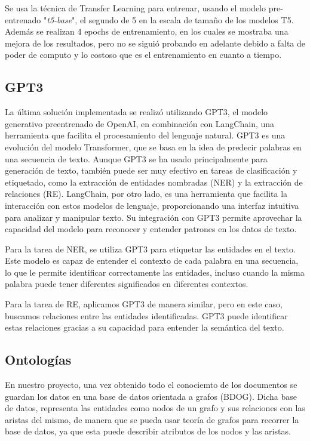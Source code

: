\documentclass[10pt]{article} %
\begin{document}
	Se usa la técnica de Transfer Learning para entrenar, usando el modelo pre-entrenado "\textit{t5-base}", el segundo de 5 en la escala de tamaño de los modelos T5. Además se realizan 4 epochs de entrenamiento, en los cuales se mostraba una mejora de los resultados, pero no se siguió probando en adelante debido a falta de poder de computo y lo costoso que es el entrenamiento en cuanto a tiempo.
	
	\subsection{GPT3}
	
	La \'ultima soluci\'on implementada se realiz\'o utilizando GPT3, el modelo generativo preentrenado de OpenAI, en combinación con LangChain, una herramienta que facilita el procesamiento del lenguaje natural. GPT3 es una evolución del modelo Transformer, que se basa en la idea de predecir palabras en una secuencia de texto. Aunque GPT3 se ha usado principalmente para generación de texto, también puede ser muy efectivo en tareas de clasificación y etiquetado, como la extracción de entidades nombradas (NER) y la extracción de relaciones (RE). LangChain, por otro lado, es una herramienta que facilita la interacción con estos modelos de lenguaje, proporcionando una interfaz intuitiva para analizar y manipular texto. Su integración con GPT3 permite aprovechar la capacidad del modelo para reconocer y entender patrones en los datos de texto.
	
	Para la tarea de NER, se utiliza GPT3 para etiquetar las entidades en el texto. Este modelo es capaz de entender el contexto de cada palabra en una secuencia, lo que le permite identificar correctamente las entidades, incluso cuando la misma palabra puede tener diferentes significados en diferentes contextos.
	
	Para la tarea de RE, aplicamos GPT3 de manera similar, pero en este caso, buscamos relaciones entre las entidades identificadas. GPT3 puede identificar estas relaciones gracias a su capacidad para entender la semántica del texto.
	
	\subsection{Ontolog\'ias}
	
	En nuestro proyecto, una vez obtenido todo el conociemto de los documentos se guardan los datos en una base de datos orientada a grafos (BDOG). Dicha base de datos, representa las entidades como nodos de un grafo y sus relaciones con las aristas del mismo, de manera que se pueda usar teoría de grafos para recorrer la base de datos, ya que esta puede describir atributos de los nodos y las aristas.
	
\end{document}
